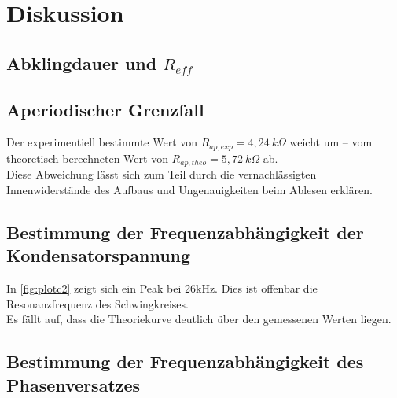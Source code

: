 \section{Diskussion}
\label{sec:Diskussion}


\subsection{Abklingdauer und $R_{eff}$}
\label{subsec:diskussion5a}

\subsection{Aperiodischer Grenzfall}
\label{subsec:diskussion5b}

Der experimentiell bestimmte Wert von $R_{ap,exp} = 4,24 \: k\Omega$ weicht um -- vom theoretisch berechneten Wert von 
$R_{ap,theo} = 5,72 \: k\Omega$ ab. \\
Diese Abweichung lässt sich zum Teil durch die vernachlässigten Innenwiderstände des Aufbaus und Ungenauigkeiten 
beim Ablesen erklären.\\


\subsection{Bestimmung der Frequenzabhängigkeit der Kondensatorspannung}
\label{subsec:diskussion5c}

In \autoref{fig:plotc2} zeigt sich ein Peak bei 26kHz. Dies ist offenbar die Resonanzfrequenz
des Schwingkreises. \\
Es fällt auf, dass die Theoriekurve deutlich über den gemessenen Werten liegen.\\ %



\subsection{Bestimmung der Frequenzabhängigkeit des Phasenversatzes}
\label{subsec:diskussion5d}